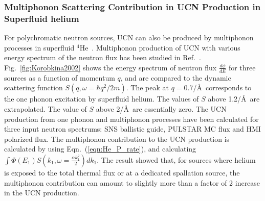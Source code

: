 


 \subsubsection{Multiphonon Scattering Contribution in UCN Production
   in Superfluid helium}
 For polychromatic neutron sources, UCN can also be produced by
 multiphonon processes in superfluid
 $^4$He~\cite{Korobkina2002,Schmidt2009}. Multiphonon production of
 UCN with various energy spectrum of the neutron flux has been studied
 in Ref.~\cite{Korobkina2002}.  Fig.~\ref{fig:Korobkina2002} shows the
 energy spectrum of neutron flux $\frac{d\phi}{dE}$ for three sources
 as a function of momentum $q$, and are compared to the dynamic
 scattering function $S(q,\omega=\hbar q^2/2m)$. The peak at
 $q=0.7$/\AA~corresponds to the one phonon excitation by superfluid
 helium. The values of $S$ above 1.2/\AA~are extrapolated. The value
 of $S$ above 2/\AA~are essentially zero.  The UCN production from one
 phonon and multiphonon processes have been calculated for three input
 neutron spectrums: SNS ballistic guide, PULSTAR MC flux and HMI
 polarized flux.  The multiphonon contribution to the UCN production
 is calculated by using Eqn.~(\ref{eqn:He_P_rate}), and calculating
 $\int \Phi(E_1)S(k_1,\omega=\frac{\alpha k_1^2}{2}) dk_1$.  The
 result showed that, for sources where helium is exposed to the total
 thermal flux or at a dedicated spallation source, the multiphonon
 contribution can amount to slightly more than a factor of 2 increase
 in the UCN production.





